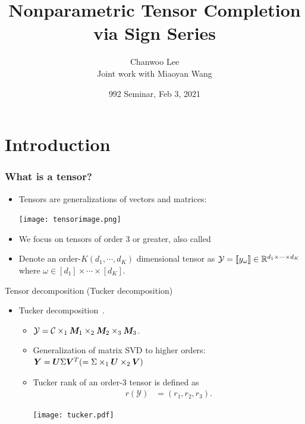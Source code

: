 \documentclass[10pt, mathserif]{beamer} %
\title{Nonparametric Tensor Completion via Sign Series}
\author{Chanwoo Lee\\ Joint work with Miaoyan Wang}
\institute{\scriptsize Department of Statistics \\University of Wisconsin - Madison}
\date{\small{992 Seminar, Feb 3, 2021}}
\theoremstyle{definition}
\theoremstyle{plain}
\begin{document}
\renewcommand{\raggedright}{\leftskip=0pt \rightskip=0pt plus 0cm}

\begin{frame}[plain]{}{}
\titlepage
\end{frame}



\section{Introduction}
\begin{frame}[label = slide1]
    \frametitle{What is a tensor?}
    \begin{itemize}
        \item Tensors are generalizations of vectors and matrices:
        \begin{center}
            \texttt{[image: tensorimage.png]}
        \end{center}
         \item We focus on tensors of order 3 or greater, also called {\color{red}{higher-order tensors.} }
        \item Denote an order-$K (d_1,\cdots,d_K)$ dimensional tensor as $\mathcal{Y} = \llbracket y_\omega \rrbracket\in\mathbb{R}^{d_1\times\cdots\times d_K}$ \\
        where $\omega \in [d_1]\times \cdots\times [d_K].$
    \end{itemize}
\end{frame}





\begin{frame}{Tensor decomposition (Tucker decomposition)}
\begin{itemize}
    \item Tucker decomposition~\citep{de2000multilinear}.
    \begin{itemize}
    \item $\mathcal{Y} = \mathcal{C}\times_1 \bm M_1\times_2 \bm M_2 \times_3 \bm M_3$.
    \item Generalization of matrix SVD to higher orders: $\bm Y = \bm{U}\Sigma\bm{V}^T (=\Sigma\times_1\bm{U}\times_2\bm{V})$
    \item Tucker rank of an order-3 tensor is defined as
    \vspace{-0.3cm}
    \begin{align*}
    r(\mathcal{Y}) &= (r_1,r_2,r_3).
    \end{align*}
   
    \begin{center}
    \texttt{[image: tucker.pdf]}
    \end{center}
    \end{itemize}
\end{itemize}
\end{frame}
\end{document}
